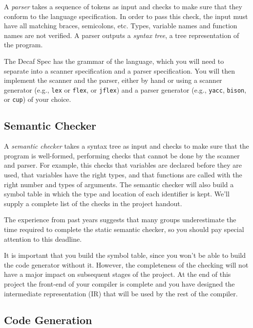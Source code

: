 \documentclass[11pt]{article}
\begin{document}
A \textit{parser} takes a sequence of tokens as input and checks to make sure that they conform to the language specification.
In order to pass this check, the input must have all matching braces, semicolons, etc.
Types, variable names and function names are not verified.
A parser outputs a \textit{syntax tree}, a tree representation of the program.

The Decaf Spec has the grammar of the language, which you will need to separate into a scanner specification and a parser specification.
You will then implement the scanner and the parser, either by hand or using a scanner generator (e.g., \texttt{lex} or \texttt{flex}, or \texttt{jflex}) and a parser generator (e.g., \texttt{yacc}, \texttt{bison}, or \texttt{cup}) of your choice.

\subsection{Semantic Checker}

A \emph{semantic checker} takes a syntax tree as input and checks to make sure that the program is well-formed, performing checks that cannot be done by the scanner and parser.
For example, this checks that variables are declared before they are used, that variables have the right types, and that functions are called with the right number and types of arguments.
The semantic checker will also build a symbol table in which the type and location of each identifier is kept.
We'll supply a complete list of the checks in the project handout.

The experience from past years suggests that many groups underestimate the time required to complete the static semantic checker, so you should pay special attention to this deadline.

It is important that you build the symbol table, since you won't be able to build the code generator without it.
However, the completeness of the checking will not have a major impact on subsequent stages of the project.
At the end of this project the front-end of your compiler is complete and you have designed the intermediate representation (IR) that will be used by the rest of the compiler.

\subsection{Code Generation}
\end{document}
